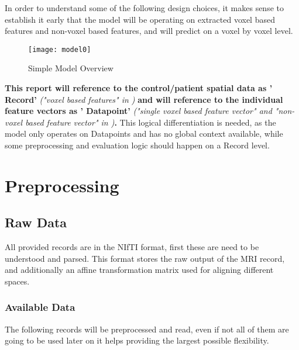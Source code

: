 In order to understand some of the following design choices, it makes sense to establish it early that the model will be operating on extracted voxel based features and non-voxel based features, and will predict on a voxel by voxel level.

\begin{figure}[H]
\centering
\texttt{[image: model0]}
\caption{Simple Model Overview}
\label{fig:model0}
\end{figure}

\textbf{This report will reference to the control/patient spatial data as '{\color{red} Record}'} \emph{("voxel based features" in )} \textbf{and will reference to the individual feature vectors as '{\color{red} Datapoint}'} \emph{("single voxel based feature vector" and "non-voxel based feature vector" in )}\textbf{.} This logical differentiation is needed, as the model only operates on Datapoints and has no global context available, while some preprocessing and evaluation logic should happen on a Record level.

\section{Preprocessing}

\subsection{Raw Data}
All provided records are in the \ac{NIfTI} format, first these are need to be understood and parsed. This format stores the raw output of the \ac{MRI} record, and additionally an affine transformation matrix used for aligning different spaces.

\subsubsection{Available Data}
The following records will be preprocessed and read, even if not all of them are going to be used later on it helps providing the largest possible flexibility.

